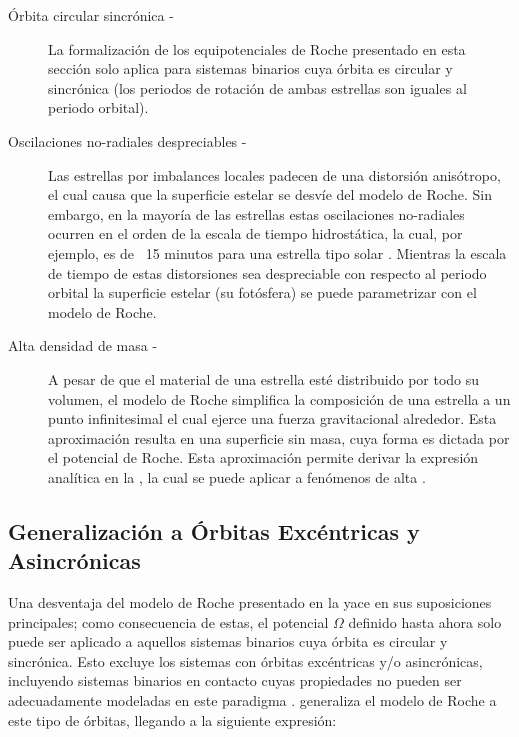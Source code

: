 \begin{description}
	\item[Órbita circular sincrónica -] La formalización de los equipotenciales
	de Roche presentado en esta sección solo aplica para sistemas binarios cuya
	órbita es circular y sincrónica (los periodos de rotación de ambas estrellas
	son iguales al periodo orbital). 
	
	\item[Oscilaciones no-radiales despreciables -]  Las estrellas por
	imbalances locales padecen de una distorsión anisótropo, el cual causa que
	la superficie estelar se desvíe del modelo de Roche. Sin embargo, en la
	mayoría de las estrellas estas oscilaciones no-radiales ocurren en el orden
	de la escala de tiempo hidrostática, la cual, por ejemplo, es de ~15 minutos
	para una estrella tipo solar
	. Mientras
	la escala de tiempo de estas distorsiones sea despreciable con respecto al
	periodo orbital la superficie estelar (su fotósfera) se puede parametrizar
	con el modelo de Roche.

	\item[Alta densidad de masa -] A pesar de que el material de una estrella
	esté distribuido por todo su volumen, el modelo de Roche simplifica la
	composición de una estrella a un punto infinitesimal el cual ejerce una
	fuerza gravitacional alrededor. Esta aproximación resulta en una superficie
	sin masa, cuya forma es dictada por el potencial de Roche. Esta aproximación
	permite derivar la expresión analítica en la , la
	cual se puede aplicar a fenómenos de alta 
	.
\end{description}

\subsection{Generalización a Órbitas Excéntricas y Asincrónicas}

Una desventaja del modelo de Roche presentado en la 
yace en sus suposiciones principales; como consecuencia de estas, el potencial
$\Omega$ definido hasta ahora solo puede ser aplicado a aquellos sistemas
binarios cuya órbita es circular y sincrónica. Esto excluye los sistemas con
órbitas excéntricas y/o asincrónicas, incluyendo sistemas binarios en contacto
cuyas propiedades no pueden ser adecuadamente modeladas en este paradigma
.
 generaliza el modelo de Roche a este tipo de
órbitas, llegando a la siguiente expresión:

